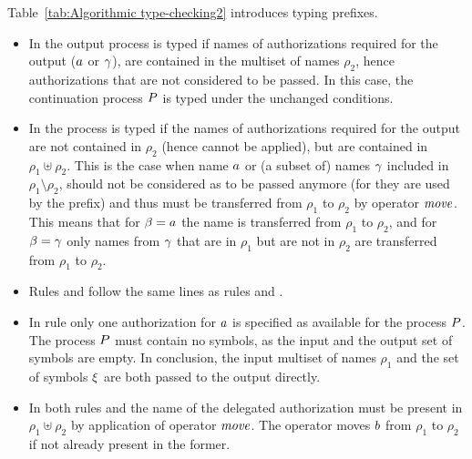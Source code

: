 Table~\ref{tab:Algorithmic type-checking2} introduces typing prefixes.
\begin{itemize}
\item 
In  the output process is typed if names of authorizations required for the output ($a$ or $\gamma$), are contained in the multiset of names $\rho_2$, hence authorizations that are not considered to be passed. In this case, the continuation process $P$ is typed under the unchanged conditions.
\item In  the process is typed if the names of authorizations required for the output are not contained in $\rho_2$ (hence  cannot be applied), but are contained in $\rho_1\uplus\rho_2$.
This is the case when name $a$ or (a subset of) names $\gamma$ included in 
$\rho_1\setminus\rho_2$, should not be considered as to be passed anymore (for they are used by the prefix) and thus must be transferred 
from $\rho_1$ to $\rho_2$ by operator $\mathit{move}$. 
%
This means that for $\beta=a$ the name is transferred from $\rho_1$ to $\rho_2$, and for  $\beta=\gamma$ only names from $\gamma$ that are in $\rho_1$ but are not in $\rho_2$ are transferred from $\rho_1$ to $\rho_2$.
%
\item 
     Rules  and  follow the same lines as rules 
 and . 
%
\item 
     In rule  only one authorization for $a$ is specified as available for the process $P$. %
     The process $P$ must contain no symbols, as the input and the output set of symbols are empty. In conclusion, the input multiset of names $\rho_1$ and the set of symbols $\xi$ are both passed to the output directly.
\item 
     In both rules  and  the name of the delegated 
authorization must be present in $\rho_1\uplus\rho_2$ by application of operator $\mathit{move}$. The operator moves $b$ from $\rho_1$ to $\rho_2$ if not already present in the former.

\end{itemize}
